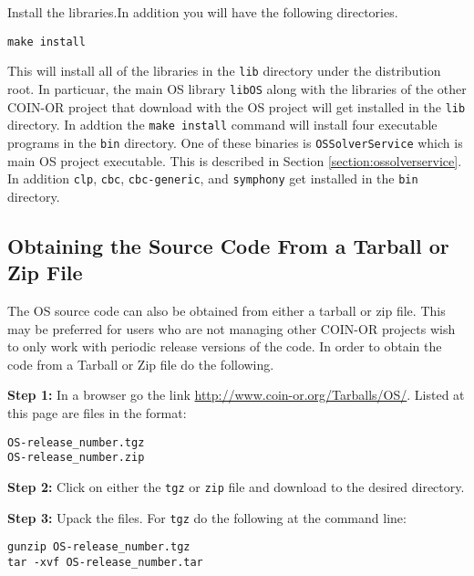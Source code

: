 \documentclass[11pt]{article}
\renewcommand{\_}{{\char"5F}}
\renewcommand{\{}{{\char"7B}}
\renewcommand{\}}{{\char"7D}}
\renewcommand{\^}{{\char"0D}}
\renewcommand{\'}{{\char"0D}}
\begin{document}
\vskip 8pt

  Install the libraries.In addition you will have the following directories.

\begin{verbatim}
make install
\end{verbatim}

This will install all of the libraries in the {\tt lib} directory under the distribution root.  In particuar, the main OS library {\tt libOS} along with the libraries of the other COIN-OR project that download with the OS project will get installed in the {\tt lib} directory.  In addtion the {\tt make install} command will install four executable programs in the {\tt bin} directory.  One of these binaries is {\tt OSSolverService} which is main OS project executable. This is described in Section \ref{section:ossolverservice}. In addition {\tt clp}, {\tt cbc}, {\tt cbc-generic}, and {\tt symphony} get installed  in the {\tt bin} directory. 

\subsection{Obtaining the Source Code From a Tarball or Zip File}

The OS source code can also be obtained from either a  tarball or zip file.  This may be preferred for users who are not managing other COIN-OR projects wish to only work with periodic release versions of the code.  In order to obtain the code from a Tarball or Zip file do the following. 

\vskip 8pt

{\bf Step 1:} In a browser go the link \url{http://www.coin-or.org/Tarballs/OS/}.  Listed at this page are files in the format:

\begin{verbatim}
OS-release_number.tgz
OS-release_number.zip
\end{verbatim}

\vskip 8pt

{\bf Step 2:} Click on either the {\tt tgz} or {\tt zip} file and download to the desired directory.

\vskip 8pt

{\bf Step 3:} Upack the files. For {\tt tgz} do the following at the command line:
\begin{verbatim}
gunzip OS-release_number.tgz
tar -xvf OS-release_number.tar
\end{verbatim}
\end{document}

